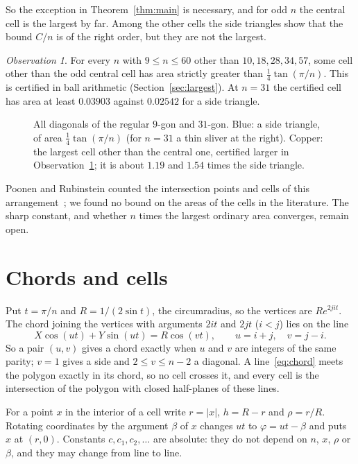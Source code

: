\documentclass[11pt]{amsart}
\theoremstyle{remark}
\newtheorem{observation}[theorem]{Observation}
\begin{document}
So the exception in Theorem~\ref{thm:main} is necessary, and for odd $n$ the central cell is the largest by far. Among the other cells the side triangles show that the bound $C/n$ is of the right order, but they are not the largest.

\begin{observation}\label{obs:largest}
For every $n$ with $9\le n\le60$ other than $10,18,28,34,57$, some cell other than the odd central cell has area strictly greater than $\frac14\tan(\pi/n)$. This is certified in ball arithmetic (Section~\ref{sec:largest}). At $n=31$ the certified cell has area at least $0.03903$ against $0.02542$ for a side triangle.
\end{observation}

\begin{figure}[ht]
\centering

\caption{All diagonals of the regular $9$-gon and $31$-gon. Blue: a side triangle, of area $\frac14\tan(\pi/n)$ (for $n=31$ a thin sliver at the right). Copper: the largest cell other than the central one, certified larger in Observation~\ref{obs:largest}; it is about $1.19$ and $1.54$ times the side triangle.}
\label{fig:polygon}
\end{figure}

Poonen and Rubinstein counted the intersection points and cells of this arrangement~\cite{PR}; we found no bound on the areas of the cells in the literature. The sharp constant, and whether $n$ times the largest ordinary area converges, remain open.

\section{Chords and cells}

Put $t=\pi/n$ and $R=1/(2\sin t)$, the circumradius, so the vertices are $R e^{2jit}$. The chord joining the vertices with arguments $2it$ and $2jt$ ($i<j$) lies on the line
\begin{equation}\label{eq:chord}
X\cos(ut)+Y\sin(ut)=R\cos(vt),\qquad u=i+j,\quad v=j-i .
\end{equation}
So a pair $(u,v)$ gives a chord exactly when $u$ and $v$ are integers of the same parity; $v=1$ gives a side and $2\le v\le n-2$ a diagonal. A line~\eqref{eq:chord} meets the polygon exactly in its chord, so no cell crosses it, and every cell is the intersection of the polygon with closed half-planes of these lines.

For a point $x$ in the interior of a cell write $r=|x|$, $h=R-r$ and $\rho=r/R$. Rotating coordinates by the argument $\beta$ of $x$ changes $ut$ to $\varphi=ut-\beta$ and puts $x$ at $(r,0)$. Constants $c,c_1,c_2,\dots$ are absolute: they do not depend on $n$, $x$, $\rho$ or $\beta$, and they may change from line to line.
\end{document}
